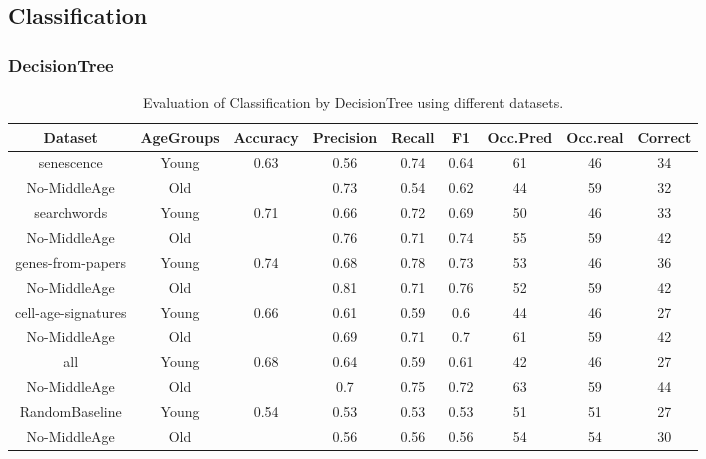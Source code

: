 \subsection*{Classification}
\subsubsection*{DecisionTree}
\begin{table}[H]
	\centering
	\small
	\begin{tabular}{|c|c|c|c|c|c|c|c|c|}
		\hline
		\textbf{Dataset} & \textbf{AgeGroups} & \textbf{Accuracy} & \textbf{Precision} & \textbf{Recall} & \textbf{F1} & \textbf{Occ.Pred} & \textbf{Occ.real} & \textbf{Correct} \\ \hline
		senescence & Young & 0.63 & 0.56 & 0.74 & 0.64 & 61 & 46 & 34 \\
		No-MiddleAge & Old &   & 0.73 & 0.54 & 0.62 & 44 & 59 & 32 \\
		\hline
		searchwords & Young & 0.71 & 0.66 & 0.72 & 0.69 & 50 & 46 & 33 \\
		No-MiddleAge & Old &   & 0.76 & 0.71 & 0.74 & 55 & 59 & 42 \\
		\hline
		genes-from-papers & Young & 0.74 & 0.68 & 0.78 & 0.73 & 53 & 46 & 36 \\
		No-MiddleAge & Old &   & 0.81 & 0.71 & 0.76 & 52 & 59 & 42 \\
		\hline
		cell-age-signatures & Young & 0.66 & 0.61 & 0.59 & 0.6 & 44 & 46 & 27 \\
		No-MiddleAge & Old &   & 0.69 & 0.71 & 0.7 & 61 & 59 & 42 \\
		\hline
		all & Young & 0.68 & 0.64 & 0.59 & 0.61 & 42 & 46 & 27 \\
		No-MiddleAge & Old &   & 0.7 & 0.75 & 0.72 & 63 & 59 & 44 \\
		\hline
		RandomBaseline & Young & 0.54 & 0.53 & 0.53 & 0.53 & 51 & 51 & 27 \\
		No-MiddleAge & Old &   & 0.56 & 0.56 & 0.56 & 54 & 54 & 30 \\
		\hline
	\end{tabular}
	\caption{Evaluation of Classification by DecisionTree using different datasets.}
	\label{tab:ClassificationDecisionTreeNo-MiddleAge}
\end{table}